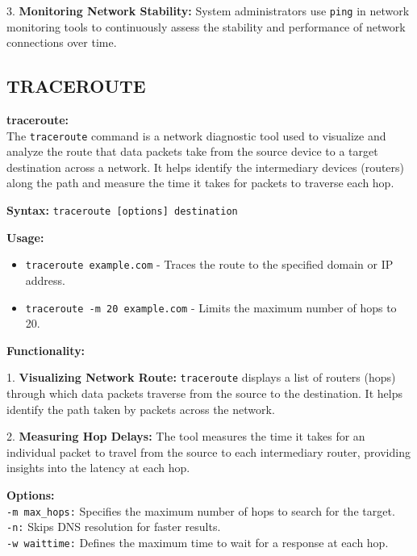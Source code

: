 \documentclass[11pt]{report}
\begin{document}
3. \textbf{Monitoring Network Stability:} System administrators use \texttt{ping} in network monitoring tools to continuously assess the stability and performance of network connections over time.


\subsection{TRACEROUTE}
\textbf{traceroute:} \\
The \texttt{traceroute} command is a network diagnostic tool used to visualize and analyze the route that data packets take from the source device to a target destination across a network. It helps identify the intermediary devices (routers) along the path and measure the time it takes for packets to traverse each hop.

\vspace{\baselineskip}

\textbf{Syntax:}
\texttt{traceroute [options] destination}

\vspace{\baselineskip}

\textbf{Usage:}
\begin{itemize}
    \item \texttt{traceroute example.com} - Traces the route to the specified domain or IP address.
    \item \texttt{traceroute -m 20 example.com} - Limits the maximum number of hops to 20.
\end{itemize}

\vspace{\baselineskip}

\textbf{Functionality:}

1. \textbf{Visualizing Network Route:} \texttt{traceroute} displays a list of routers (hops) through which data packets traverse from the source to the destination. It helps identify the path taken by packets across the network.

2. \textbf{Measuring Hop Delays:} The tool measures the time it takes for an individual packet to travel from the source to each intermediary router, providing insights into the latency at each hop.

\vspace{\baselineskip}

\textbf{Options:} \\
\texttt{-m max\_hops:} Specifies the maximum number of hops to search for the target.\\
\texttt{-n:} Skips DNS resolution for faster results.\\
\texttt{-w waittime:} Defines the maximum time to wait for a response at each hop.
\end{document}
